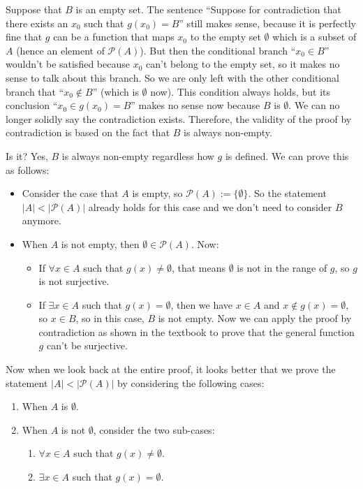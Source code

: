 \documentclass[12pt, letterpaper, oneside]{book}
\begin{document}
Suppose that $B$ is an empty set. The sentence ``Suppose for contradiction that
there exists an $x_0$ such that $g(x_0) = B$'' still makes sense, because it is
perfectly fine that $g$ can be a function that maps $x_0$ to the empty set
$\emptyset$ which is a subset of $A$ (hence an element of $\mathcal{P}(A)$).
But then the conditional branch ``$x_0 \in B$'' wouldn't be satisfied because
$x_0$ can't belong to the empty set, so it makes no sense to talk about this
branch. So we are only left with the other conditional branch that ``$x_0 \notin
  B$'' (which is $\emptyset$ now). This condition always holds, but its conclusion
``$x_0 \in g(x_0) = B$'' makes no sense now because $B$ is $\emptyset$. We can
no longer solidly say the contradiction exists. Therefore, the validity of the
proof by contradiction is based on the fact that $B$ is always non-empty.

Is it? Yes, $B$ is always non-empty regardless how $g$ is defined. We can prove
this as follows:

\begin{itemize}
  \item Consider the case that $A$ is empty, so $\mathcal{P}(A):=
          \{\emptyset\}$. So the statement $|A| < |\mathcal{P}(A)|$ already holds for
        this case and we don't need to consider $B$ anymore.
  \item When $A$ is not empty, then $\emptyset \in \mathcal{P}(A)$. Now:
        \begin{itemize}
          \item If $\forall x \in A$ such that $g(x) \neq \emptyset$, that means
                $\emptyset$ is not in the range of $g$, so $g$ is not surjective.
          \item If $\exists x \in A$ such that $g(x) = \emptyset$, then we have
                $x \in A$ and $x \notin g(x) = \emptyset$, so $x \in B$, so in this case,
                $B$ is not empty. Now we can apply the proof by contradiction as shown in
                the textbook to prove that the general function $g$ can't be surjective.
        \end{itemize}
\end{itemize}

Now when we look back at the entire proof, it looks better that we prove the
statement $|A| < |\mathcal{P}(A)|$ by considering the following cases:
\begin{enumerate}
  \item When $A$ is $\emptyset$.
  \item When $A$ is not $\emptyset$, consider the two sub-cases:
        \begin{enumerate}
          \item $\forall x \in A$ such that $g(x) \neq \emptyset$.
          \item $\exists x \in A$ such that $g(x) = \emptyset$.
        \end{enumerate}
\end{enumerate}
\end{document}
